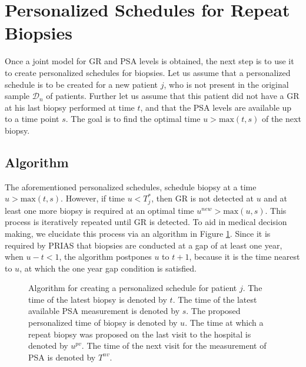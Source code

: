 \section{Personalized Schedules for Repeat Biopsies}
\label{sec : pers_sched_approaches}
Once a joint model for GR and PSA levels is obtained, the next step is to use it to create personalized schedules for biopsies. Let us assume that a personalized schedule is to be created for a new patient $j$, who is not present in the original sample $\mathcal{D}_n$ of patients. Further let us assume that this patient did not have a GR at his last biopsy performed at time $t$, and that the PSA levels are available up to a time point $s$. The goal is to find the optimal time $u > \mbox{max}(t,s)$ of the next biopsy. 





\subsection{Algorithm}
\label{subsec : pers_sched_algorithm}
The aforementioned personalized schedules, schedule biopsy at a time $u > \mbox{max}(t,s)$. However, if time $u < T^*_j$, then GR is not detected at $u$ and at least one more biopsy is required at an optimal time $u^{new} > \mbox{max}(u,s)$. This process is iteratively repeated until GR is detected. To aid in medical decision making, we elucidate this process via an algorithm in Figure \ref{fig : sched_algorithm}. Since it is required by PRIAS that biopsies are conducted at a gap of at least one year, when $u - t < 1$, the algorithm postpones $u$ to $t + 1$, because it is the time nearest to $u$, at which the one year gap condition is satisfied.


\begin{figure}
\label{fig : sched_algorithm}
\centerline{}
\caption{Algorithm for creating a personalized schedule for patient $j$. The time of the latest biopsy is denoted by $t$. The time of the latest available PSA measurement is denoted by $s$. The proposed personalized time of biopsy is denoted by $u$.  The time at which a repeat biopsy was proposed on the last visit to the hospital is denoted by $u^{pv}$. The time of the next visit for the measurement of PSA is denoted by $T^{nv}$.} 
\end{figure}

